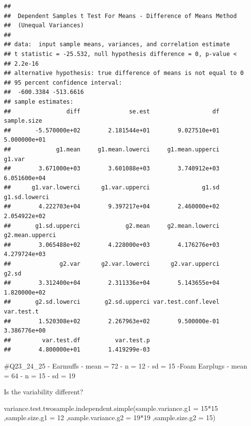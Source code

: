 \documentclass[
]{article}
\newenvironment{Shaded}{\begin{snugshade}}{\end{snugshade}}
\newcommand{\AttributeTok}[1]{\textcolor[rgb]{0.77,0.63,0.00}{#1}}
\newcommand{\DecValTok}[1]{\textcolor[rgb]{0.00,0.00,0.81}{#1}}
\newcommand{\FunctionTok}[1]{\textcolor[rgb]{0.00,0.00,0.00}{#1}}
\newcommand{\NormalTok}[1]{#1}
\newcommand{\SpecialCharTok}[1]{\textcolor[rgb]{0.00,0.00,0.00}{#1}}
\begin{document}
\begin{verbatim}
## 
##  Dependent Samples t Test For Means - Difference of Means Method
##  (Unequal Variances)
## 
## data:  input sample means, variances, and correlation estimate
## t statistic = -25.532, null hypothesis difference = 0, p-value <
## 2.2e-16
## alternative hypothesis: true difference of means is not equal to 0
## 95 percent confidence interval:
##  -600.3384 -513.6616
## sample estimates:
##                diff              se.est                  df         sample.size 
##       -5.570000e+02        2.181544e+01        9.027510e+01        5.000000e+01 
##             g1.mean     g1.mean.lowerci     g1.mean.upperci              g1.var 
##        3.671000e+03        3.601088e+03        3.740912e+03        6.051600e+04 
##      g1.var.lowerci      g1.var.upperci               g1.sd       g1.sd.lowerci 
##        4.222703e+04        9.397217e+04        2.460000e+02        2.054922e+02 
##       g1.sd.upperci             g2.mean     g2.mean.lowerci     g2.mean.upperci 
##        3.065488e+02        4.228000e+03        4.176276e+03        4.279724e+03 
##              g2.var      g2.var.lowerci      g2.var.upperci               g2.sd 
##        3.312400e+04        2.311336e+04        5.143655e+04        1.820000e+02 
##       g2.sd.lowerci       g2.sd.upperci var.test.conf.level          var.test.t 
##        1.520308e+02        2.267963e+02        9.500000e-01        3.386776e+00 
##         var.test.df          var.test.p 
##        4.800000e+01        1.419299e-03
\end{verbatim}

\#Q23\_24\_25 - Earmuffs - mean = 72 - n = 12 - sd = 15 -Foam Earplugs -
mean = 64 - n = 15 - sd = 19

Is the variability different?

\begin{Shaded}
\begin{Highlighting}[]
\FunctionTok{variance.test.twosample.independent.simple}\NormalTok{(}\AttributeTok{sample.variance.g1 =} \DecValTok{15}\SpecialCharTok{*}\DecValTok{15}
\NormalTok{                                              ,}\AttributeTok{sample.size.g1 =} \DecValTok{12}
\NormalTok{                                              ,}\AttributeTok{sample.variance.g2 =} \DecValTok{19}\SpecialCharTok{*}\DecValTok{19}
\NormalTok{                                              ,}\AttributeTok{sample.size.g2 =} \DecValTok{15}\NormalTok{)}
\end{Highlighting}
\end{Shaded}
\end{document}
